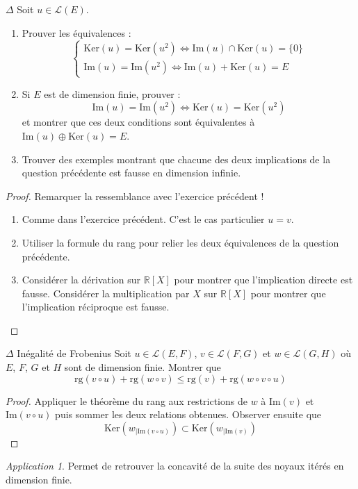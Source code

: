 \documentclass[french,a4paper]{article}
\newcommand{\R}{\mathbb{R}}
\renewcommand{\ker}{\text{Ker}}
\newcommand{\im}{\text{Im}}
\theoremstyle{plain}
\theoremstyle{definition}
\theoremstyle{remark}
\newtheorem*{app}{Application}
\begin{document}
\begin{ex}[Moulin.EV.36]{$\Delta$}
	Soit $u\in\mathcal{L}(E)$.
	\begin{enumerate}
		\item Prouver les équivalences : $$\begin{cases}
			\text{Ker}(u)=\text{Ker}(u^2)\iff\text{Im}(u)\cap\text{Ker}(u)=\{0\}\\
			\text{Im}(u)=\text{Im}(u^2)\iff \text{Im}(u)+\text{Ker}(u)=E
		\end{cases}$$
		\item Si $E$ est de dimension finie, prouver : $$\text{Im}(u)=\text{Im}(u^2)\iff\ker(u)=\ker(u^2)$$ et montrer que ces deux conditions sont équivalentes à $\text{Im}(u)\oplus\ker(u)=E$.
		\item Trouver des exemples montrant que chacune des deux implications de la question précédente est fausse en dimension infinie.
	\end{enumerate}
\end{ex}
\begin{proof}
	Remarquer la ressemblance avec l'exercice précédent !
	\begin{enumerate}
		\item Comme dans l'exercice précédent. C'est le cas particulier $u=v$.
		\item Utiliser la formule du rang pour relier les deux équivalences de la question précédente.
		\item Considérer la dérivation sur $\R[X]$ pour montrer que l'implication directe est fausse. Considérer la multiplication par $X$ sur $\R[X]$ pour montrer que l'implication réciproque est fausse.
	\end{enumerate}
\end{proof}

\begin{ex}[Moulin.EV.37]{$\Delta$ Inégalité de Frobenius}
	Soit $u\in\mathcal{L}(E,F)$, $v\in\mathcal{L}(F,G)$ et $w\in\mathcal{L}(G,H)$ où $E$, $F$, $G$ et $H$ sont de dimension finie. Montrer que $$\text{rg}(v\circ u)+\text{rg}(w\circ v)\leqslant\text{rg}(v)+\text{rg}(w\circ v\circ u)$$
\end{ex}
\begin{proof}
	Appliquer le théorème du rang aux restrictions de $w$ à $\im(v)$ et $\im(v\circ u)$ puis sommer les deux relations obtenues. Observer ensuite que $$\ker(w_{\mid\im(v\circ u)})\subset\ker(w_{\mid\im(v)})$$
\end{proof}
\begin{app}
	Permet de retrouver la concavité de la suite des noyaux itérés en dimension finie.
\end{app}
\end{document}
